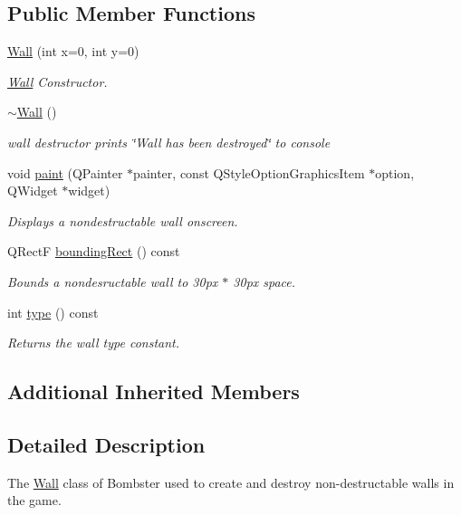 \subsection*{Public Member Functions}
\begin{DoxyCompactItemize}
\item 
\hyperlink{class_wall_a23004a32bc2720e18793d6db6a5f0fd5}{Wall} (int x=0, int y=0)
\begin{DoxyCompactList}\small\item\em \hyperlink{class_wall}{Wall} Constructor. \end{DoxyCompactList}\item 
\hyperlink{class_wall_a9a2992f2b533e1c160513d1e719f920c}{$\sim$\-Wall} ()
\begin{DoxyCompactList}\small\item\em wall destructor prints \char`\"{}\-Wall has been destroyed\char`\"{} to console \end{DoxyCompactList}\item 
void \hyperlink{class_wall_aae57ed47f7d5d58b513d2ebd8feb8057}{paint} (Q\-Painter $\ast$painter, const Q\-Style\-Option\-Graphics\-Item $\ast$option, Q\-Widget $\ast$widget)
\begin{DoxyCompactList}\small\item\em Displays a nondestructable wall onscreen. \end{DoxyCompactList}\item 
Q\-Rect\-F \hyperlink{class_wall_aae7888200bcd5afb12b24110886366a0}{bounding\-Rect} () const 
\begin{DoxyCompactList}\small\item\em Bounds a nondesructable wall to 30px $\ast$ 30px space. \end{DoxyCompactList}\item 
int \hyperlink{class_wall_ab31daa81d4977819c8e231621c7573d7}{type} () const 
\begin{DoxyCompactList}\small\item\em Returns the wall type constant. \end{DoxyCompactList}\end{DoxyCompactItemize}
\subsection*{Additional Inherited Members}


\subsection{Detailed Description}
The \hyperlink{class_wall}{Wall} class of Bombster used to create and destroy non-\/destructable walls in the game. 

